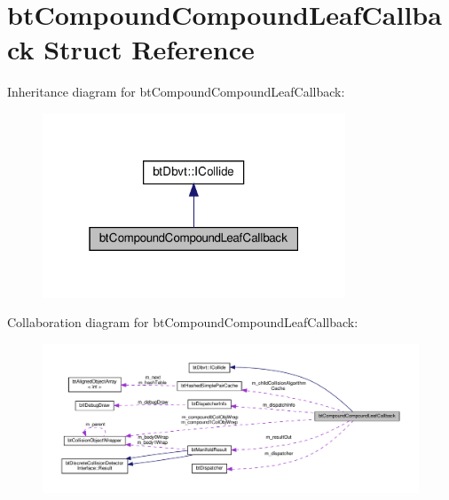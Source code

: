 \hypertarget{structbtCompoundCompoundLeafCallback}{}\section{bt\+Compound\+Compound\+Leaf\+Callback Struct Reference}
\label{structbtCompoundCompoundLeafCallback}


Inheritance diagram for bt\+Compound\+Compound\+Leaf\+Callback\+:
\nopagebreak
\begin{figure}[H]
\begin{center}
\leavevmode
\includegraphics[width=256pt]{structbtCompoundCompoundLeafCallback__inherit__graph}
\end{center}
\end{figure}


Collaboration diagram for bt\+Compound\+Compound\+Leaf\+Callback\+:
\nopagebreak
\begin{figure}[H]
\begin{center}
\leavevmode
\includegraphics[width=350pt]{structbtCompoundCompoundLeafCallback__coll__graph}
\end{center}
\end{figure}
